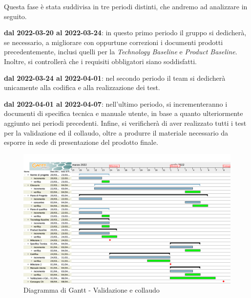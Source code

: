 Questa fase è stata suddivisa in tre periodi distinti, che andremo ad analizzare in seguito.


\textbf{dal 2022-03-20 al 2022-03-24}: in questo primo periodo il gruppo si dedicherà, se necessario, a migliorare con oppurtune correzioni i documenti prodotti precedentemente, inclusi quelli per la \textit{Technology Baseline} e \textit{Product Baseline}. Inoltre, si controllerà che i requisiti obbligatori siano soddisfatti.


\textbf{dal 2022-03-24 al 2022-04-01}: nel secondo periodo il team si dedicherà unicamente alla codifica e alla realizzazione dei test.


\textbf{dal 2022-04-01 al 2022-04-07}: nell'ultimo periodo, si incrementeranno i documenti di specifica tecnica e manuale utente, in base a quanto ulteriormente aggiunto nei periodi precedenti. Infine, si verificherà di aver realizzato tutti i test per la validazione ed il collaudo, oltre a produrre il materiale necessario da esporre in sede di presentazione del prodotto finale.

\begin{figure}[H]
\centering
\includegraphics[scale=0.35]{Sezioni/gantt/validazione_collaudo.png}
\caption{Diagramma di Gantt - Validazione e collaudo}
\end{figure}